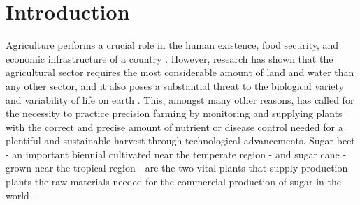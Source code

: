 \chapter{Introduction}
\label{cha:Introduction}


 Agriculture performs a crucial role in the human existence, food security, and economic infrastructure of a country \cite{pawlak2020role}. However, research has shown that the agricultural sector requires the most considerable amount of land and water than any other sector, and it also poses a substantial threat to the biological variety and variability of life on earth \cite{agriculture2008state,green2005farming}. This, amongst many other reasons, has called for the necessity to practice precision farming by monitoring and supplying plants with the correct and precise amount of nutrient or disease control needed for a plentiful and sustainable harvest through technological advancements. Sugar beet - an important biennial cultivated near the temperate region - and sugar cane - grown near the tropical region - are the two vital plants that supply production plants the raw materials needed for the commercial production of sugar in the world \cite{Barreto2020HyperspectralIO, draycott2008sugar}.

